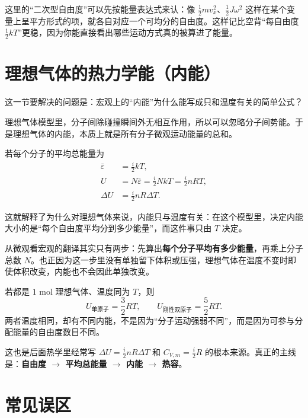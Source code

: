 \documentclass[lang=cn,11pt]{elegantbook}
\newcommand{\bridge}[1]{\begin{note}#1\end{note}}
\begin{document}
\begin{note}
这里的“二次型自由度”可以先按能量表达式来认：像 \(\frac12 mv_x^2\)、\(\frac12 J\omega^2\) 这样在某个变量上呈平方形式的项，就各自对应一个可均分的自由度。这样记比空背“每自由度 \(\frac12 kT\)”更稳，因为你能直接看出哪些运动方式真的被算进了能量。
\end{note}

\section{理想气体的热力学能（内能）}

这一节要解决的问题是：宏观上的“内能”为什么能写成只和温度有关的简单公式？

理想气体模型里，分子间除碰撞瞬间外无相互作用，所以可以忽略分子间势能。于是理想气体的内能，本质上就是所有分子微观运动能量的总和。

若每个分子的平均总能量为
\[
\begin{aligned}
\bar\varepsilon&=\frac{i}{2}kT,\\
U&=N\bar\varepsilon=\frac{i}{2}NkT=\frac{i}{2}nRT,\\
\Delta U&=\frac{i}{2}nR\Delta T.
\end{aligned}
\]

这就解释了为什么对理想气体来说，内能只与温度有关：在这个模型里，决定内能大小的是“每个自由度平均分到多少能量”，而这件事只由 \(T\) 决定。

\bridge{从微观看宏观的翻译其实只有两步：先算出\textbf{每个分子平均有多少能量}，再乘上分子总数 \(N\)。也正因为这一步里没有单独留下体积或压强，理想气体在温度不变时即使体积改变，内能也不会因此单独改变。}

\begin{example}[单原子和双原子理想气体的内能为什么不同]
若都是 \(1\) mol 理想气体、温度同为 \(T\)，则
\[
U_{\text{单原子}}=\frac{3}{2}RT,\qquad
U_{\text{刚性双原子}}=\frac{5}{2}RT.
\]
两者温度相同，却有不同内能，不是因为“分子运动强弱不同”，而是因为可参与分配能量的自由度数目不同。
\end{example}

\begin{remark}
这也是后面热学里经常写 \(\Delta U=\frac{i}{2}nR\Delta T\) 和 \(C_{V,m}=\frac{i}{2}R\) 的根本来源。真正的主线是：\textbf{自由度 \(\rightarrow\) 平均总能量 \(\rightarrow\) 内能 \(\rightarrow\) 热容}。
\end{remark}

\section{常见误区}
\end{document}
